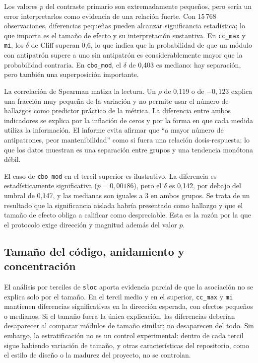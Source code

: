 Los valores $p$ del contraste primario son extremadamente pequeños, pero sería un error interpretarlos como evidencia de una relación fuerte. Con 15\,768 observaciones, diferencias pequeñas pueden alcanzar significancia estadística; lo que importa es el tamaño de efecto y su interpretación sustantiva. En \texttt{cc\_max} y \texttt{mi}, los $\delta$ de Cliff superan 0,6, lo que indica que la probabilidad de que un módulo con antipatrón supere a uno sin antipatrón es considerablemente mayor que la probabilidad contraria. En \texttt{cbo\_mod}, el $\delta$ de 0,403 es mediano: hay separación, pero también una superposición importante.

La correlación de Spearman matiza la lectura. Un $\rho$ de 0,119 o de $-0{,}123$ explica una fracción muy pequeña de la variación y no permite usar el número de hallazgos como predictor práctico de la métrica. La diferencia entre ambos indicadores se explica por la inflación de ceros y por la forma en que cada medida utiliza la información. El informe evita afirmar que “a mayor número de antipatrones, peor mantenibilidad” como si fuera una relación dosis-respuesta; lo que los datos muestran es una separación entre grupos y una tendencia monótona débil.

El caso de \texttt{cbo\_mod} en el tercil superior es ilustrativo. La diferencia es estadísticamente significativa ($p=0{,}00186$), pero el $\delta$ es 0,142, por debajo del umbral de 0,147, y las medianas son iguales a 3 en ambos grupos. Se trata de un resultado que la significancia aislada habría presentado como hallazgo y que el tamaño de efecto obliga a calificar como despreciable. Esta es la razón por la que el protocolo exige dirección y magnitud además del valor $p$.

\subsection{Tamaño del código, anidamiento y concentración}

El análisis por terciles de \texttt{sloc} aporta evidencia parcial de que la asociación no se explica solo por el tamaño. En el tercil medio y en el superior, \texttt{cc\_max} y \texttt{mi} mantienen diferencias significativas en la dirección esperada, con efectos pequeños o medianos. Si el tamaño fuera la única explicación, las diferencias deberían desaparecer al comparar módulos de tamaño similar; no desaparecen del todo. Sin embargo, la estratificación no es un control experimental: dentro de cada tercil sigue habiendo variación de tamaño, y otras características del repositorio, como el estilo de diseño o la madurez del proyecto, no se controlan.

